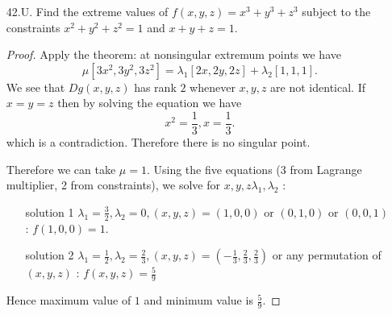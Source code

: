 \begin{itemize}
\begin{proof}
	We split into cases. Note that $g_1$ and $g_2$ cannot be simultaneously active; neither can $g_3$ and $g_4$. Also, note that active constraints are always linearly independent in this problem, so we can take $\mu = 1$ in the theorem.
	\begin{itemize}
		\item $g_1$ active: then 
			\[
				[2x+2, 2y] = [\lambda_1, 0]
			.\] 
			Thus
			\[
				y = 0, x = -1
			.\] 
		\item $g_2$ active: then
			\[
				y=0, x=1
			.\] 
		\item $g_3$ active: then
			\[
				[2x+2, 2y] = [0, \lambda_3]
			.\] 
			Thus
			\[
				y = -1, x = -1
			.\] 
			so $g_1$ must also be active.
		\item $g_4$ active: then
			\[
				y = 1, x = -1
			.\] 
			so $g_1$ must also be active.
		\item $g_2, g_3$ active:
			\[
				y = -1, x = 1
			.\] 
		\item $g_2, g_4$ active:
			\[
				y = 1, x = 1
			.\] 
		\item None of constraints are active:
			\[
				[2x+2, 2y] = [0,0]
			.\] 
			Thus
			\[
			y = 0, x = -1
			.\] 
			which requires $g_1$ to be active. So this case does not exist.
	\end{itemize}
	Iterate through all those candidates, we find that
	\begin{itemize}
		\item $f$ achieves local maximum at $(1, 1)$ and $(1,-1)$, the value of $f$ is $3$.
		\item $f$ achieves local minimum at $(-1, 0)$, the value of $f$ is $-1$.
	\end{itemize}
\end{proof}

\item [42.U.] Find the extreme values of $f(x, y, z)=x^3+y^3+z^3$ subject to the constraints $x^2+y^2+z^2=1$ and $x+y+z=1$.
\begin{proof}
	Apply the theorem: at nonsingular extremum points we have
	\[
		\mu [3x^2, 3y^2, 3z^2] = \lambda_1 [2x, 2y, 2z] + \lambda_2 [1,1,1]
	.\] 
	We see that $Dg(x,y,z)$ has rank $2$ whenever $x,y,z$ are not identical. If $x=y=z$ then by solving the equation we have
	\[
		x^2 = \frac{1}{3}, x = \frac{1}{3}
	.\] 
	which is a contradiction. Therefore there is no singular point.

	Therefore we can take $\mu = 1$. Using the five equations (3 from Lagrange multiplier, 2 from constraints), we solve for  $x,y,z \lambda_1, \lambda_2$ :
\begin{itemize}
	\item [solution 1] $\lambda_1 = \frac{3}{2}, \lambda_2 = 0, (x,y,z) = (1,0,0)$ or $(0,1,0)$ or  $(0,0,1)$ : $f(1,0,0) = 1$. 
	\item [solution 2] $\lambda_1 = \frac{1}{2}, \lambda_2 = \frac{2}{3}, (x,y,z) = (-\frac{1}{3}, \frac{2}{3}, \frac{2}{3})$ or any permutation of $(x,y,z)$ : $f(x,y,z) = \frac{5}{9}$
\end{itemize}
Hence maximum value of $1$ and minimum value is $\frac{5}{9}$.
	


\end{proof}
\end{itemize}

